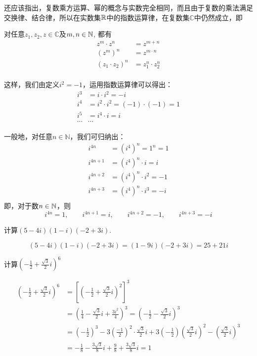 还应该指出，复数乘方运算、幂的概念与实数完全相同，而且由于复数的乘法满足交换律、结合律，所以在实数集$\mathbb{R}$中的指数运算律，在复数集$\mathbb{C}$中仍然成立，即

对任意$z_1,z_2,z\in\mathbb{C}$及$m,n\in\mathbb{N}$, 都有
\[\begin{split}
    z^m\cdot z^n&=z^{m+n}\\
    (z^m)^n&=z^{m\cdot n}\\
    (z_1\cdot z_2)^n&=z^{n}_1\cdot z^{n}_2\\
\end{split}\]

这样，我们由定义$i^2=-1$，运用指数运算律可以得出：
\[\begin{split}
i^3&=i\cdot i^2=-i\\
i^4&=i^2\cdot i^2=(-1)\cdot (-1)=1\\
i^5&=i^4\cdot i=i\\
\cdots&\cdots
\end{split}\]

一般地，对任意$n\in\mathbb{N}$，我们可归纳出：
\[\begin{split}
    i^{4n}&=(i^4)^n=1^n=1\\
    i^{4n+1}&=(i^4)^n\cdot i=i\\
    i^{4n+2}&=(i^4)^n\cdot i^2=-1\\
    i^{4n+3}&=(i^4)^n\cdot i^3=-i\\
\end{split}\]
即，对于数$n\in\mathbb{N}$，则
\[i^{4n}=1,\qquad i^{4n+1}=i,\qquad i^{4n+2}=-1,\qquad i^{4n+3}=-i\]

\begin{example}
    计算$(5-4i)(1-i)(-2+3i)$.
\end{example}

\begin{solution}
\[(5-4i)(1-i)(-2+3i)=(1- 9i) (- 2+ 3i) = 25+ 21i\]
\end{solution}

\begin{example}
    计算$\left(-\frac12+\frac{\sqrt{3}}{2}i\right)^6$
\end{example}

\begin{solution}
\[\begin{split}
    \left(-\frac12+\frac{\sqrt{3}}{2}i\right)^6&=\left[\left(-\frac12+\frac{\sqrt{3}}{2}i\right)^2\right]^3\\
&= \left(\frac{1}{4}-\frac{\sqrt{3}}{2}i+\frac{3i^{2}}{4}\right)^{3}=\left(-\frac{1}{2}-\frac{\sqrt{3}}{2}i\right)^3\\
&=\left( - \frac 12\right) ^{3}- 3\left( \frac {- 1}{2}\right)^{2}\cdot \frac {\sqrt {3}}2i+3\left(-\frac{1}{2}\right)\left(\frac{\sqrt{3}}{2}i\right)^{2}-\left(\frac{\sqrt{3}}{2}i\right)^{3}\\
&=-\frac{1}{8}-\frac{3\sqrt{3}}{8}i+\frac{9}{8}+\frac{3\sqrt{3}}{8}i=1
\end{split}\]
\end{solution}


